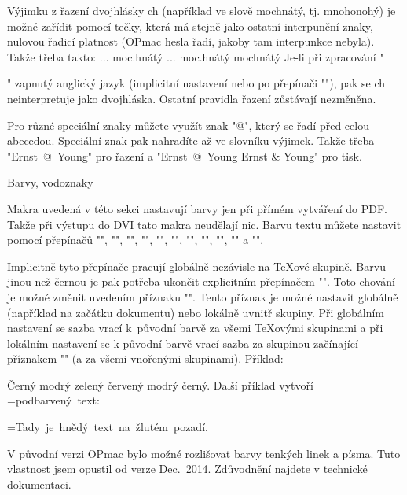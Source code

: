 Výjimku z řazení dvojhlásky ch (například ve slově mochnátý, tj. mnohonohý)
je možné zařídit pomocí tečky, která má stejně jako ostatní interpunční
znaky, nulovou řadicí platnost (OPmac hesla řadí, jakoby tam interpunkce
nebyla). Takže třeba takto:
\begtt
... \ii moc.hnátý ...
\iis moc.hnátý {mochnátý} 
\endtt
%
Je-li při zpracování "\makeindex" zapnutý anglický jazyk (implicitní
nastavení nebo po přepínači
"\ehyph"), pak se ch neinterpretuje jako dvojhláska. Ostatní pravidla řazení
zůstávají nezměněna.

Pro různé speciální znaky můžete využít znak "@", který se řadí před celou
abecedou. Speciální znak pak nahradíte až ve slovníku výjimek.
Takže třeba "\ii Ernst~@~Young" pro řazení a
"\iis Ernst~@~Young {Ernst \& Young}" pro tisk.


\sec Barvy, vodoznaky

Makra uvedená v této sekci nastavují barvy jen při přímém
vytváření do PDF. Takže při výstupu do DVI tato makra neudělají nic.
%
Barvu textu můžete nastavit pomocí přepínačů 
{\localcolor\Blue "\Blue"}, 
{\localcolor\Red "\Red"}, 
{\localcolor\Brown "\Brown"},
{\localcolor\Green "\Green"}, 
{\localcolor\Yellow "\Yellow"}, 
{\localcolor\Cyan "\Cyan"}, 
{\localcolor\Magenta "\Magenta"}, 
{"\White"}, 
{\localcolor\Grey "\Grey"}, 
{\localcolor\LightGrey "\LightGrey"} a 
{"\Black"}. 

Implicitně tyto přepínače pracují globálně nezávisle na \TeX{}ové skupině.
Barvu jinou než černou je pak potřeba ukončit explicitním přepínačem
"\Black". Toto chování je možné změnit uvedením příznaku "\localcolor".
Tento příznak je možné nastavit globálně (například na začátku dokumentu)
nebo lokálně uvnitř skupiny. Při globálním nastavení se sazba vrací 
k~původní barvě za všemi \TeX{}ovými skupinami 
a při lokálním nastavení se k původní barvě vrací sazba
za skupinou začínající příznakem "\localcolor" (a za všemi vnořenými skupinami).
Příklad:

\def\podbarvi#1#2#3{\setbox0=\hbox{#3}\leavevmode
  {\localcolor\rlap{#1\strut\vrule width\wd0}#2\box0}}

\begtt
Černý {\localcolor \Blue modrý {\Green zelený \Red červený} modrý} černý. 
\endtt
%
Další příklad vytvoří \podbarvi\Yellow\Brown{podbarvený text:}

\begtt
\def\podbarvi#1#2#3{\setbox0=\hbox{#3}\leavevmode
   {\localcolor\rlap{#1\strut\vrule width\wd0}#2}}
   \podbarvi\Yellow\Brown{Tady je hnědý text na žlutém pozadí.}
\endtt

V původní verzi OPmac bylo možné rozlišovat barvy tenkých linek a písma.
Tuto vlastnost jsem opustil od verze Dec.~2014. Zdůvodnění najdete v
technické dokumentaci.

